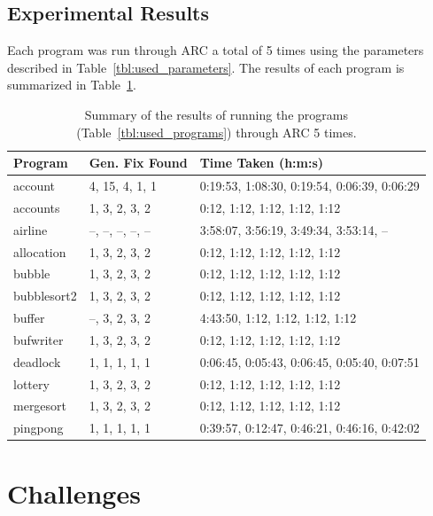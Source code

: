 \documentclass{llncs}
\begin{document}
\subsection{Experimental Results}
\label{sec:experimental_results}

Each program was run through ARC a total of 5 times using the parameters
described in Table~\ref{tbl:used_parameters}. The results of each program is
summarized in Table~\ref{tbl:summary_results}.

\begin{table}%
\caption{Summary of the results of running the programs
(Table~\ref{tbl:used_programs}) through ARC 5 times.}
\begin{center}
\lstset{basicstyle=\scriptsize}
\begin{tabular}{|l|l|l|}
\hline
\textbf{Program} & \textbf{Gen. Fix Found} & \textbf{Time Taken (h:m:s)}\\
\hline
account & 4, 15, 4, 1, 1 & 0:19:53, 1:08:30, 0:19:54, 0:06:39, 0:06:29\\
\hline
accounts & 1, 3, 2, 3, 2 & 0:12, 1:12, 1:12, 1:12, 1:12\\
\hline
airline & --, --, --, --, -- & 3:58:07, 3:56:19, 3:49:34, 3:53:14, --\\
\hline
allocation & 1, 3, 2, 3, 2 & 0:12, 1:12, 1:12, 1:12, 1:12\\
\hline
bubble & 1, 3, 2, 3, 2 & 0:12, 1:12, 1:12, 1:12, 1:12\\
\hline
bubblesort2 & 1, 3, 2, 3, 2 & 0:12, 1:12, 1:12, 1:12, 1:12\\
\hline
buffer & --, 3, 2, 3, 2 & 4:43:50, 1:12, 1:12, 1:12, 1:12\\
\hline
bufwriter & 1, 3, 2, 3, 2 & 0:12, 1:12, 1:12, 1:12, 1:12\\
\hline
deadlock & 1, 1, 1, 1, 1 & 0:06:45, 0:05:43, 0:06:45, 0:05:40, 0:07:51\\
\hline
lottery & 1, 3, 2, 3, 2 & 0:12, 1:12, 1:12, 1:12, 1:12\\
\hline
mergesort & 1, 3, 2, 3, 2 & 0:12, 1:12, 1:12, 1:12, 1:12\\
\hline
pingpong & 1, 1, 1, 1, 1 & 0:39:57, 0:12:47, 0:46:21, 0:46:16, 0:42:02\\
\hline
\end{tabular}
\label{tbl:summary_results}
\end{center}
\end{table}


\section{Challenges}
\label{sec:challenges}
\end{document}
